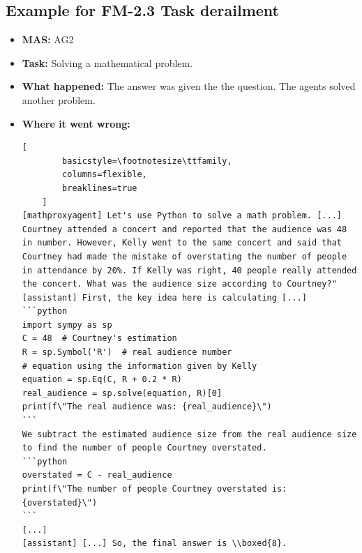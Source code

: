 \subsection{Example for FM-2.3 Task derailment}\label{ex:fm2.5}
\begin{itemize}
    \item \textbf{MAS:} AG2 
    \item \textbf{Task:} Solving a mathematical problem.
    \item \textbf{What happened:} The answer was given the the question. The agents solved another problem. 
    \item \textbf{Where it went wrong:}
    \begin{lstlisting}[
        basicstyle=\footnotesize\ttfamily,
        columns=flexible,
        breaklines=true
    ]
[mathproxyagent] Let's use Python to solve a math problem. [...] Courtney attended a concert and reported that the audience was 48 in number. However, Kelly went to the same concert and said that Courtney had made the mistake of overstating the number of people in attendance by 20%. If Kelly was right, 40 people really attended the concert. What was the audience size according to Courtney?"
[assistant] First, the key idea here is calculating [...] 
```python
import sympy as sp
C = 48  # Courtney's estimation
R = sp.Symbol('R')  # real audience number
# equation using the information given by Kelly
equation = sp.Eq(C, R + 0.2 * R)
real_audience = sp.solve(equation, R)[0]
print(f\"The real audience was: {real_audience}\")
```
We subtract the estimated audience size from the real audience size to find the number of people Courtney overstated.
```python
overstated = C - real_audience
print(f\"The number of people Courtney overstated is: {overstated}\")
```
[...]
[assistant] [...] So, the final answer is \\boxed{8}.
    \end{lstlisting}
\end{itemize}



